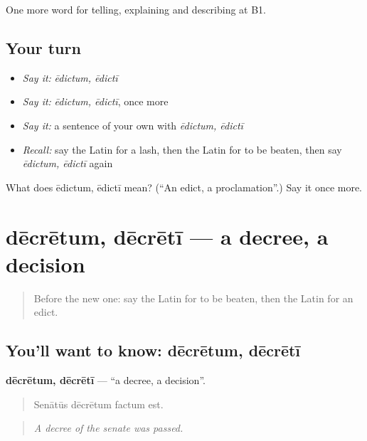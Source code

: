 \begin{grammarlens}[title={What you've built}]
One more word for telling, explaining and describing at B1.
\end{grammarlens}

\subsection*{Your turn}
\begin{itemize}
\raggedright
  \item \emph{Say it:} \emph{ēdictum, ēdictī}
  \item \emph{Say it:} \emph{ēdictum, ēdictī}, once more
  \item \emph{Say it:} a sentence of your own with \emph{ēdictum, ēdictī}
  \item \emph{Recall:} say the Latin for a lash, then the Latin for to be beaten, then say \emph{ēdictum, ēdictī} again
\end{itemize}

\begin{tcolorbox}[breakable,colback=teal!4,colframe=teal!35!black,title={Before you move on}]
What does ēdictum, ēdictī mean? (\textquotedblleft{}An edict, a proclamation\textquotedblright{}.) Say it once more.
\end{tcolorbox}
\section[dēcrētum, dēcrētī]{dēcrētum, dēcrētī — a decree, a decision}

\label{lesson:LA-C409-decretum}



\begin{quote}
Before the new one: say the Latin for to be beaten, then the Latin for an edict.
\end{quote}

\subsection*{You'll want to know: dēcrētum, dēcrētī}
\textbf{dēcrētum, dēcrētī} — \textquotedblleft{}a decree, a decision\textquotedblright{}.

\begin{quote}
Senātūs dēcrētum factum est.
\end{quote}

\begin{quote}
\emph{A decree of the senate was passed.}
\end{quote}

